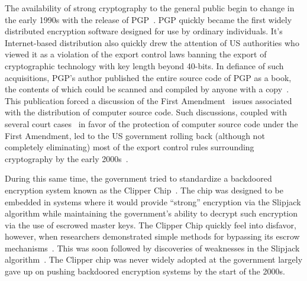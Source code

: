 The availability of strong cryptography to the general public begin to
change in the early 1990s with the release of
PGP~\cite{zimmermann-pgp10}. PGP quickly became the first widely
distributed encryption software designed for use by ordinary
individuals. It's Internet-based distribution also quickly drew the
attention of US authorities who viewed it as a violation of the export
control laws banning the export of cryptographic technology with key
length beyond 40-bits. In defiance of such acquisitions, PGP's author
published the entire source code of PGP as a book, the contents of
which could be scanned and compiled by anyone with a
copy~\cite{zimmermann-pgpsource}. This publication forced a discussion
of the First Amendment~\cite{us-constitution-amend1} issues associated
with the distribution of computer source code. Such discussions,
coupled with several court cases~\cite{ninthcir-bernstein,
  sixthcir-junger} in favor of the protection of computer source code
under the First Amendment, led to the US government rolling back
(although not completely eliminating) most of the export control rules
surrounding cryptography by the early 2000s~\cite{kehl2015}.

During this same time, the government tried to standardize a
backdoored encryption system known as the Clipper
Chip~\cite{whitehouse-clipper}. The chip was designed to be embedded
in systems where it would provide ``strong'' encryption via the
Slipjack algorithm while maintaining the government's ability to
decrypt such encryption via the use of escrowed master keys. The
Clipper Chip quickly feel into disfavor, however, when researchers
demonstrated simple methods for bypassing its escrow
mechanisms~\cite{blaze1994}. This was soon followed by discoveries of
weaknesses in the Slipjack algorithm~\cite{biham1998}. The Clipper
chip was never widely adopted at the government largely gave up on
pushing backdoored encryption systems by the start of the 2000s.

